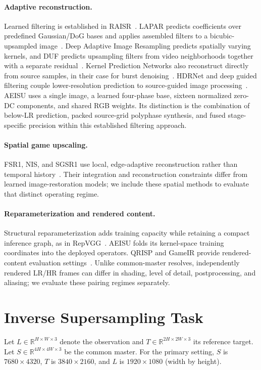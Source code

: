 \documentclass[10pt,twocolumn,letterpaper]{article}
\newcommand{\model}{AEISU}
\newcommand{\R}{\mathbb{R}}
\begin{document}
\paragraph{Adaptive reconstruction.}
Learned filtering is established in RAISR~\cite{romano2016raisr}.
LAPAR predicts coefficients over predefined Gaussian/DoG bases and applies assembled filters to a bicubic-upsampled image~\cite{li2021lapar}.
Deep Adaptive Image Resampling predicts spatially varying kernels, and DUF predicts upsampling filters from video neighborhoods together with a separate residual~\cite{jia2017adaptive,jo2018duf}.
Kernel Prediction Networks also reconstruct directly from source samples, in their case for burst denoising~\cite{mildenhall2018kpn}.
HDRNet and deep guided filtering couple lower-resolution prediction to source-guided image processing~\cite{gharbi2017hdrnet,wu2018guided}.
\model{} uses a single image, a learned four-phase base, sixteen normalized zero-DC components, and shared RGB weights.
Its distinction is the combination of below-LR prediction, packed source-grid polyphase synthesis, and fused stage-specific precision within this established filtering approach.

\paragraph{Spatial game upscaling.}
FSR1, NIS, and SGSR1 use local, edge-adaptive reconstruction rather than temporal history~\cite{amd2021fsr,nvidia2022nis,qualcomm2023gsr}.
Their integration and reconstruction constraints differ from learned image-restoration models; we include these spatial methods to evaluate that distinct operating regime.

\paragraph{Reparameterization and rendered content.}
Structural reparameterization adds training capacity while retaining a compact inference graph, as in RepVGG~\cite{ding2021repvgg}.
\model{} folds its kernel-space training coordinates into the deployed operators.
QRISP and GameIR provide rendered-content evaluation settings~\cite{mercier2023qrisp,zhou2024gameir}.
Unlike common-master resolves, independently rendered LR/HR frames can differ in shading, level of detail, postprocessing, and aliasing; we evaluate these pairing regimes separately.

\section{Inverse Supersampling Task}
\label{sec:task}
Let $L\in\R^{H\times W\times3}$ denote the observation and $T\in\R^{2H\times2W\times3}$ its reference target.
Let $S\in\R^{4H\times4W\times3}$ be the common master.
For the primary setting, $S$ is $7680\times4320$, $T$ is $3840\times2160$, and $L$ is $1920\times1080$ (width by height).
\end{document}
